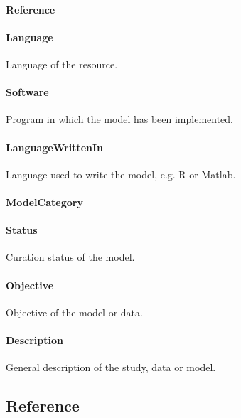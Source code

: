 \documentclass[a4paper]{report}
\begin{document}
\paragraph{Reference}

\paragraph{Language}
Language of the resource.

\paragraph{Software}
Program in which the model has been implemented.

\paragraph{LanguageWrittenIn}
Language used to write the model, e.g. R or Matlab.

\paragraph{ModelCategory}

\paragraph{Status}
Curation status of the model.

\paragraph{Objective}
Objective of the model or data.

\paragraph{Description}
General description of the study, data or model.

\subsection{Reference}
\end{document}

